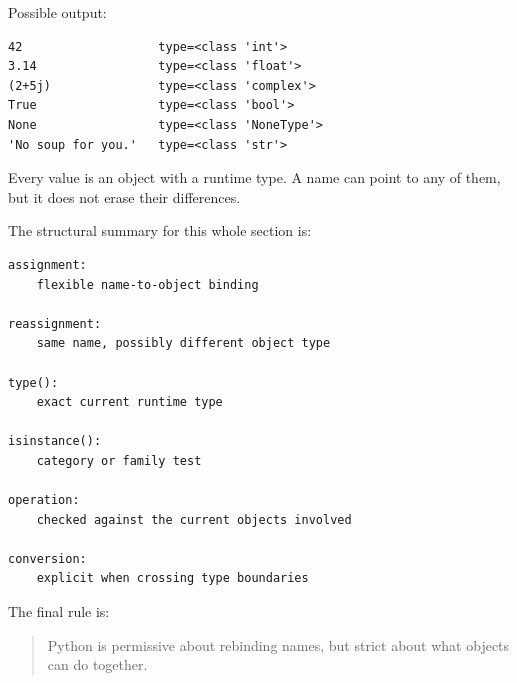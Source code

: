Possible output:

\begin{verbatim}
42                   type=<class 'int'>
3.14                 type=<class 'float'>
(2+5j)               type=<class 'complex'>
True                 type=<class 'bool'>
None                 type=<class 'NoneType'>
'No soup for you.'   type=<class 'str'>
\end{verbatim}

Every value is an object with a runtime type. A name can point to any of them, but it does not erase their differences.

The structural summary for this whole section is:

\begin{verbatim}
assignment:
    flexible name-to-object binding

reassignment:
    same name, possibly different object type

type():
    exact current runtime type

isinstance():
    category or family test

operation:
    checked against the current objects involved

conversion:
    explicit when crossing type boundaries
\end{verbatim}

The final rule is:

\begin{quote}
Python is permissive about rebinding names, but strict about what objects can do together.
\end{quote}
